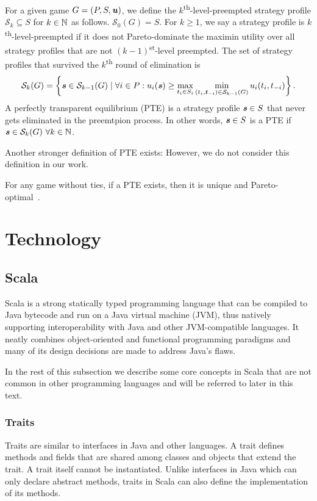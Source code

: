 \begin{definition}
  For a given game $G = (P, S, \boldsymbol{\mathit{u}})$, we define the $k$\textsuperscript{th}-level-preempted strategy profile $\mathcal{S}_k \subseteq S$ for $k \in \mathbb{N}$ as follows.
  $\mathcal{S}_0(G) = S$.
  For $k \ge 1$, we say a strategy profile is $k$\textsuperscript{th}-level-preempted if it does not Pareto-dominate the maximin utility over all strategy profiles that are not $(k-1)$\textsuperscript{st}-level preempted.
  The set of strategy profiles that survived the $k$\textsuperscript{th} round of elimination is
  \[
    \mathcal{S}_k(G) = \left\{\boldsymbol{\mathit{s}} \in \mathcal{S}_{k-1}(G) \mid \forall i \in P: u_i(\boldsymbol{\mathit{s}}) \ge \max_{t_i \in S_i}\min_{(t_i, \boldsymbol{\mathit{t}}_{-i}) \in \mathcal{S}_{k-1}(G)} u_i(t_i, t_{-i})\right\}.
  \]
  A perfectly transparent equilibrium (PTE) is a strategy profile $\boldsymbol{\mathit{s}} \in S$ that never gets eliminated in the preemtpion process.
  In other words, $\boldsymbol{\mathit{s}} \in S$ is a PTE if $\boldsymbol{\mathit{s}} \in \mathcal{S}_k(G)\ \forall k \in \mathbb{N}$.
\end{definition}

\begin{remark}
  Another stronger definition of PTE exists:
  However, we do not consider this definition in our work.
\end{remark}

For any game without ties, if a PTE exists, then it is unique and Pareto-optimal~\cite{Fourny20}.


\section{Technology}

\subsection{Scala}
Scala is a strong statically typed programming language that can be compiled to Java bytecode and run on a Java virtual machine (JVM), thus natively supporting interoperability with Java and other JVM-compatible languages.
It neatly combines object-oriented and functional programming paradigms and many of its design decisions are made to address Java's flaws.

In the rest of this subsection we describe some core concepts in Scala that are not common in other programming languages and will be referred to later in this text.

\subsubsection{Traits}
Traits are similar to interfaces in Java and other languages.
A trait defines methods and fields that are shared among classes and objects that extend the trait.
A trait itself cannot be instantiated.
Unlike interfaces in Java which can only declare abstract methods, traits in Scala can also define the implementation of its methods.


